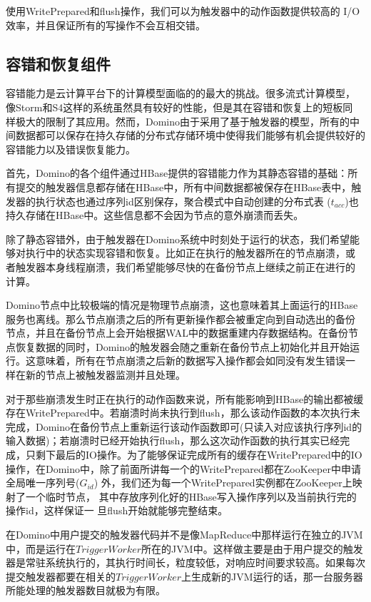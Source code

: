 使用WritePrepared和flush操作，我们可以为触发器中的动作函数提供较高的
I/O效率，并且保证所有的写操作不会互相交错。

\subsection{容错和恢复组件}
容错能力是云计算平台下的计算模型面临的的最大的挑战。很多流式计算模型，
像Storm和S4这样的系统虽然具有较好的性能，但是其在容错和恢复上的短板同
样极大的限制了其应用。然而，Domino由于采用了基于触发器的模型，所有的中
间数据都可以保存在持久存储的分布式存储环境中使得我们能够有机会提供较好的容错能力以及错误恢复能力。

首先，Domino的各个组件通过HBase提供的容错能力作为其静态容错的基础：所
有提交的触发器信息都存储在HBase中，所有中间数据都被保存在HBase表中，触
发器的执行状态也通过序列id区别保存，聚合模式中自动创建的分布式表
($t_{acc}$)也持久存储在HBase中。这些信息都不会因为节点的意外崩溃而丢失。

除了静态容错外，由于触发器在Domino系统中时刻处于运行的状态，我们希望能
够对执行中的状态实现容错和恢复。比如正在执行的触发器所在的节点崩溃，或
者触发器本身线程崩溃，我们希望能够尽快的在备份节点上继续之前正在进行的
计算。

Domino节点中比较极端的情况是物理节点崩溃，这也意味着其上面运行的HBase
服务也离线。那么节点崩溃之后的所有更新操作都会被重定向到自动选出的备份
节点，并且在备份节点上会开始根据WAL中的数据重建内存数据结构。在备份节点恢复数据的同时，Domino的触发器会随之重新在备份节点上初始化并且开始运
行。这意味着，所有在节点崩溃之后新的数据写入操作都会如同没有发生错误一
样在新的节点上被触发器监测并且处理。

对于那些崩溃发生时正在执行的动作函数来说，所有能影响到HBase的输出都被缓存在WritePrepared中。若崩溃时尚未执行到flush，那么该动作函数的本次执行未完成，Domino在备份节点上重新运行该动作函数即可(只读入对应该执行序列id的输入数据)；若崩溃时已经开始执行flush，那么这次动作函数的执行其实已经完成，只剩下最后的IO操作。为了能够保证完成所有的缓存在WritePrepared中的IO操作，在Domino中，除了前面所讲每一个的WritePrepared都在ZooKeeper中申请全局唯一序列号($G_{id}$)
外，我们还为每一个WritePrepared实例都在ZooKeeper上映射了一个临时节点，
其中存放序列化好的HBase写入操作序列以及当前执行完的操作id，这样保证一
旦flush开始就能够完整结束。

在Domino中用户提交的触发器代码并不是像MapReduce中那样运行在独立的JVM中，而是运行在$TriggerWorker$所在的JVM中。这样做主要是由于用户提交的触发器是常驻系统执行的，其执行时间长，粒度较低，对响应时间要求较高。如果每次提交触发器都要在相关的$TriggerWorker$上生成新的JVM运行的话，那一台服务器所能处理的触发器数目就极为有限。

